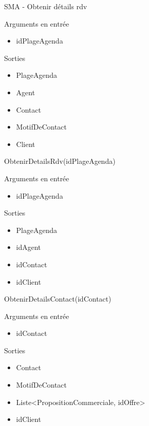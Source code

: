 \documentclass[xetex]{beamer}
\begin{document}
\begin{frame}{SMA - Obtenir détails rdv}

\begin{small}
\noindent Arguments en entrée
\begin{itemize}
\item idPlageAgenda \\
\end{itemize}

\noindent Sorties
\begin{itemize}
\item PlageAgenda 
\item Agent
\item Contact
\item MotifDeContact 
\item Client 
\end{itemize}
\end{small}

\end{frame}
    
\begin{frame}{ObtenirDetailsRdv(idPlageAgenda)}

\noindent  Arguments en entrée
\begin{itemize}
\item idPlageAgenda  \\
\end{itemize}

\noindent Sorties 
\begin{itemize}
\item PlageAgenda 
\item idAgent  
\item idContact
\item idClient 
\end{itemize}

\end{frame}

\begin{frame}{ObtenirDetailsContact(idContact)}

\noindent  Arguments en entrée
\begin{itemize}
\item idContact \\
\end{itemize}

\noindent Sorties
\begin{itemize}
\item Contact  
\item MotifDeContact  
\item Liste<PropositionCommerciale, idOffre> 
\item idClient
\end{itemize}

\end{frame}
\end{document}
